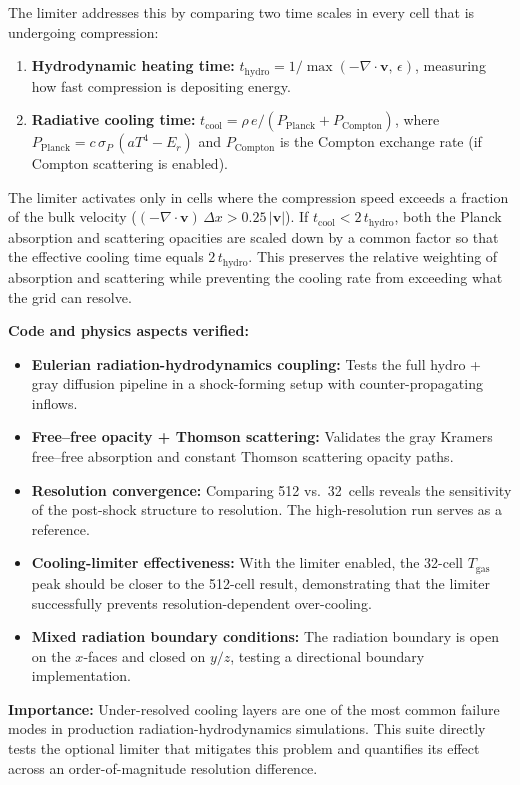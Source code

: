 \documentclass[11pt,a4paper]{article}
\begin{document}
The limiter addresses this by comparing two time scales in every cell that is undergoing compression:
\begin{enumerate}
  \item \textbf{Hydrodynamic heating time:} $t_{\mathrm{hydro}} = 1/\max(-\nabla\!\cdot\!\mathbf{v},\,\epsilon)$, measuring how fast compression is depositing energy.
  \item \textbf{Radiative cooling time:} $t_{\mathrm{cool}} = \rho\,e / (P_{\mathrm{Planck}} + P_{\mathrm{Compton}})$, where $P_{\mathrm{Planck}} = c\,\sigma_P\,(aT^4 - E_r)$ and $P_{\mathrm{Compton}}$ is the Compton exchange rate (if Compton scattering is enabled).
\end{enumerate}
The limiter activates only in cells where the compression speed exceeds a fraction of the bulk velocity ($(-\nabla\!\cdot\!\mathbf{v})\,\Delta x > 0.25\,|\mathbf{v}|$). If $t_{\mathrm{cool}} < 2\,t_{\mathrm{hydro}}$, both the Planck absorption and scattering opacities are scaled down by a common factor so that the effective cooling time equals $2\,t_{\mathrm{hydro}}$. This preserves the relative weighting of absorption and scattering while preventing the cooling rate from exceeding what the grid can resolve.

\textbf{Code and physics aspects verified:}
\begin{itemize}
  \item \textbf{Eulerian radiation-hydrodynamics coupling:} Tests the full hydro + gray diffusion pipeline in a shock-forming setup with counter-propagating inflows.
  \item \textbf{Free--free opacity + Thomson scattering:} Validates the gray Kramers free--free absorption and constant Thomson scattering opacity paths.
  \item \textbf{Resolution convergence:} Comparing 512 vs.\ 32~cells reveals the sensitivity of the post-shock structure to resolution. The high-resolution run serves as a reference.
  \item \textbf{Cooling-limiter effectiveness:} With the limiter enabled, the 32-cell $T_{\mathrm{gas}}$ peak should be closer to the 512-cell result, demonstrating that the limiter successfully prevents resolution-dependent over-cooling.
  \item \textbf{Mixed radiation boundary conditions:} The radiation boundary is open on the $x$-faces and closed on $y/z$, testing a directional boundary implementation.
\end{itemize}

\textbf{Importance:} Under-resolved cooling layers are one of the most common failure modes in production radiation-hydrodynamics simulations. This suite directly tests the optional limiter that mitigates this problem and quantifies its effect across an order-of-magnitude resolution difference.
\end{document}
